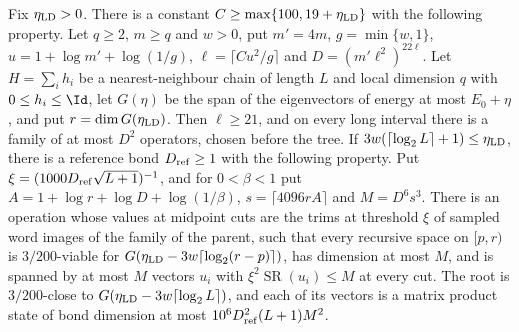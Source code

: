\begin{lemma}
    \label{lem:physical_ld_sampled_interval_tree}
    \leanok
    Fix $\eta_{\rm LD}>0$. There is a constant $C\ge\max\{100,19+\eta_{\rm LD}\}$
    with the following property. Let $q\ge2$, $m\ge q$ and $w>0$, put
    $m'=4m$, $g=\min\{w,1\}$, $u=1+\log m'+\log(1/g)$,
    $\ell=\lceil Cu^2/g\rceil$ and $D=(m'\ell^2)^{22\ell}$. Let
    $H=\sum_ih_i$ be a nearest-neighbour chain of length $L$ and local
    dimension $q$ with $0\le h_i\le\Id$, let $G(\eta)$ be the span of the
    eigenvectors of energy at most $E_0+\eta$, and put
    $r=\dim G(\eta_{\rm LD})$. Then $\ell\ge21$, and on every long interval
    there is a family of at most $D^2$ operators, chosen before the tree.
    If $3w(\lceil\log_2L\rceil+1)\le\eta_{\rm LD}$, there is a reference
    bond $D_{\rm ref}\ge1$ with the following property. Put
    $\xi=(1000D_{\rm ref}\sqrt{L+1})^{-1}$, and for $0<\beta<1$ put
    $A=1+\log r+\log D+\log(1/\beta)$, $s=\lceil4096rA\rceil$ and
    $M=D^6s^3$. There is an operation whose values at midpoint cuts are
    the trims at threshold $\xi$ of sampled word images of the family of
    the parent, such that every recursive space on $[p,r)$ is
    $3/200$-viable for $G(\eta_{\rm LD}-3w\lceil\log_2(r-p)\rceil)$, has
    dimension at most $M$, and is spanned by at most $M$ vectors $u_i$ with
    $\xi^2\operatorname{SR}(u_i)\le M$ at every cut. The root is
    $3/200$-close to $G(\eta_{\rm LD}-3w\lceil\log_2L\rceil)$, and each of
    its vectors is a matrix product state of bond dimension at most
    $10^6D_{\rm ref}^2(L+1)M^2$.
\end{lemma}
